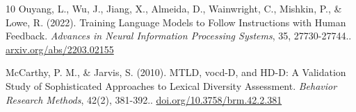 \documentclass{article}
\begin{document}
\begin{thebibliography}{10}
Ouyang, L., Wu, J., Jiang, X., Almeida, D., Wainwright, C., Mishkin, P., \& Lowe, R. (2022). Training Language Models to Follow Instructions with Human Feedback. \textit{Advances in Neural Information Processing Systems}, 35, 27730-27744.. \href{https://arxiv.org/abs/2203.02155}{arxiv.org/abs/2203.02155}

McCarthy, P. M., \& Jarvis, S. (2010). MTLD, vocd-D, and HD-D: A Validation Study of Sophisticated Approaches to Lexical Diversity Assessment. \textit{Behavior Research Methods}, 42(2), 381-392.. \href{https://doi.org/10.3758/brm.42.2.381}{doi.org/10.3758/brm.42.2.381}

\end{thebibliography}
\end{document}
